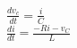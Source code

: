 \documentclass[preview]{standalone}
\begin{document}
\begin{center}
$\frac{dv_c}{dt} = \frac{i}{C}$ \\
                            $\frac{di}{dt} = \frac{-Ri - v_C}{L}$
\end{center}
\end{document}
